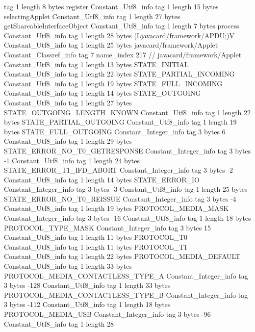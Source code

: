 {{{			tag	1
			length	8
			bytes	register
		}
		Constant_Utf8_info {
			tag	1
			length	15
			bytes	selectingApplet
		}
		Constant_Utf8_info {
			tag	1
			length	27
			bytes	getShareableInterfaceObject
		}
		Constant_Utf8_info {
			tag	1
			length	7
			bytes	process
		}
		Constant_Utf8_info {
			tag	1
			length	28
			bytes	(Ljavacard/framework/APDU;)V
		}
		Constant_Utf8_info {
			tag	1
			length	25
			bytes	javacard/framework/Applet
		}
		Constant_Classref_info {
			tag	7
			name_index	217		// javacard/framework/Applet
		}
		Constant_Utf8_info {
			tag	1
			length	13
			bytes	STATE_INITIAL
		}
		Constant_Utf8_info {
			tag	1
			length	22
			bytes	STATE_PARTIAL_INCOMING
		}
		Constant_Utf8_info {
			tag	1
			length	19
			bytes	STATE_FULL_INCOMING
		}
		Constant_Utf8_info {
			tag	1
			length	14
			bytes	STATE_OUTGOING
		}
		Constant_Utf8_info {
			tag	1
			length	27
			bytes	STATE_OUTGOING_LENGTH_KNOWN
		}
		Constant_Utf8_info {
			tag	1
			length	22
			bytes	STATE_PARTIAL_OUTGOING
		}
		Constant_Utf8_info {
			tag	1
			length	19
			bytes	STATE_FULL_OUTGOING
		}
		Constant_Integer_info {
			tag	3
			bytes	6
		}
		Constant_Utf8_info {
			tag	1
			length	29
			bytes	STATE_ERROR_NO_T0_GETRESPONSE
		}
		Constant_Integer_info {
			tag	3
			bytes	-1
		}
		Constant_Utf8_info {
			tag	1
			length	24
			bytes	STATE_ERROR_T1_IFD_ABORT
		}
		Constant_Integer_info {
			tag	3
			bytes	-2
		}
		Constant_Utf8_info {
			tag	1
			length	14
			bytes	STATE_ERROR_IO
		}
		Constant_Integer_info {
			tag	3
			bytes	-3
		}
		Constant_Utf8_info {
			tag	1
			length	25
			bytes	STATE_ERROR_NO_T0_REISSUE
		}
		Constant_Integer_info {
			tag	3
			bytes	-4
		}
		Constant_Utf8_info {
			tag	1
			length	19
			bytes	PROTOCOL_MEDIA_MASK
		}
		Constant_Integer_info {
			tag	3
			bytes	-16
		}
		Constant_Utf8_info {
			tag	1
			length	18
			bytes	PROTOCOL_TYPE_MASK
		}
		Constant_Integer_info {
			tag	3
			bytes	15
		}
		Constant_Utf8_info {
			tag	1
			length	11
			bytes	PROTOCOL_T0
		}
		Constant_Utf8_info {
			tag	1
			length	11
			bytes	PROTOCOL_T1
		}
		Constant_Utf8_info {
			tag	1
			length	22
			bytes	PROTOCOL_MEDIA_DEFAULT
		}
		Constant_Utf8_info {
			tag	1
			length	33
			bytes	PROTOCOL_MEDIA_CONTACTLESS_TYPE_A
		}
		Constant_Integer_info {
			tag	3
			bytes	-128
		}
		Constant_Utf8_info {
			tag	1
			length	33
			bytes	PROTOCOL_MEDIA_CONTACTLESS_TYPE_B
		}
		Constant_Integer_info {
			tag	3
			bytes	-112
		}
		Constant_Utf8_info {
			tag	1
			length	18
			bytes	PROTOCOL_MEDIA_USB
		}
		Constant_Integer_info {
			tag	3
			bytes	-96
		}
		Constant_Utf8_info {
			tag	1
			length	28
}}}
